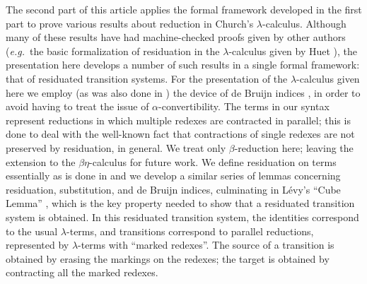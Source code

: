 \documentclass[11pt,notitlepage,a4paper]{report}
\begin{document}
The second part of this article applies the formal framework developed in the first part
to prove various results about reduction in Church's $\lambda$-calculus.
Although many of these results have had machine-checked proofs given by other authors
(\emph{e.g.}~the basic formalization of residuation in the $\lambda$-calculus given
by Huet \cite{huet-residual-theory}), the presentation here develops a number of such
results in a single formal framework: that of residuated transition systems.
For the presentation of the $\lambda$-calculus given here we employ (as was also done in
\cite{huet-residual-theory}) the device of de Bruijn indices \cite{deBruijn}, in order
to avoid having to treat the issue of $\alpha$-convertibility.
The terms in our syntax represent reductions in which multiple redexes are contracted
in parallel; this is done to deal with the well-known fact that contractions of single
redexes are not preserved by residuation, in general.
We treat only $\beta$-reduction here; leaving the extension to the $\beta\eta$-calculus
for future work.
We define residuation on terms essentially as is done in \cite{huet-residual-theory} and we develop
a similar series of lemmas concerning residuation, substitution, and de Bruijn indices,
culminating in L\'{e}vy's ``Cube Lemma'' \cite{levy}, which is the key property needed
to show that a residuated transition system is obtained.
In this residuated transition system, the identities correspond to the usual $\lambda$-terms,
and transitions correspond to parallel reductions, represented by $\lambda$-terms with
``marked redexes''.  The source of a transition is obtained by erasing the markings on
the redexes; the target is obtained by contracting all the marked redexes.
\end{document}
